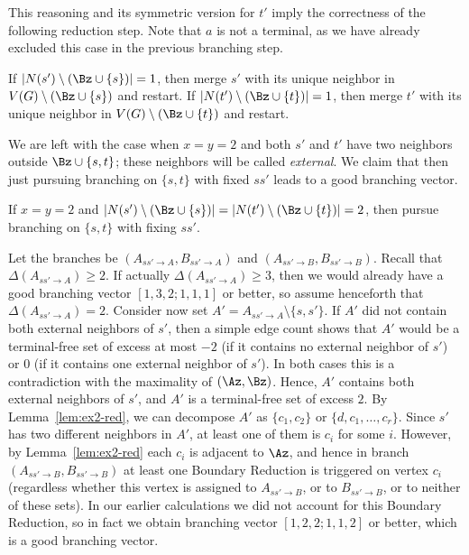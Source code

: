 This reasoning and its symmetric version for $t'$ imply the correctness of the following reduction step.
Note that $a$ is not a terminal, as we have already excluded this case in the previous branching step.

\begin{reductionstep}
If $|N(s')\setminus (\Bz\cup \{s\})|=1$, then merge $s'$ with its unique neighbor in $V(G)\setminus (\Bz\cup \{s\})$ and restart. If $|N(t')\setminus (\Bz\cup \{t\})|=1$, then merge $t'$ with its unique neighbor in $V(G)\setminus (\Bz\cup \{t\})$ and restart.
\end{reductionstep}

We are left with the case when $x=y=2$ and both $s'$ and $t'$ have two neighbors outside $\Bz\cup \{s,t\}$; these neighbors will be called {\em{external}}. We claim that then just pursuing branching on $\{s,t\}$ with fixed $ss'$ leads to a good branching vector.

\begin{branching}
If $x=y=2$ and $|N(s')\setminus (\Bz\cup \{s\})|=|N(t')\setminus (\Bz\cup \{t\})|=2$, then pursue branching on $\{s,t\}$ with fixing $ss'$.
\end{branching}

Let the branches be $(A_{ss'\to A},B_{ss'\to A})$ and $(A_{ss'\to B},B_{ss'\to B})$. Recall that $\Delta(A_{ss'\to A})\geq 2$. If actually $\Delta(A_{ss'\to A})\geq 3$, then we would already have a good branching vector $[1,3,2;1,1,1]$ or better, so assume henceforth that $\Delta(A_{ss'\to A})=2$. Consider now set $A'=A_{ss'\to A}\setminus \{s,s'\}$. If $A'$ did not contain both external neighbors of $s'$, then a simple edge count shows that $A'$ would be a terminal-free set of excess at most $-2$ (if it contains no external neighbor of $s'$) or $0$ (if it contains one external neighbor of $s'$). In both cases this is a contradiction with the maximality of $(\Az,\Bz)$. Hence, $A'$ contains both external neighbors of $s'$, and $A'$ is a terminal-free set of excess $2$. By Lemma~\ref{lem:ex2-red}, we can decompose $A'$ as $\{c_1,c_2\}$ or $\{d,c_1,\ldots,c_r\}$. Since $s'$ has two different neighbors in $A'$, at least one of them is $c_i$ for some $i$. However, by Lemma~\ref{lem:ex2-red} each $c_i$ is adjacent to $\Az$, and hence in branch $(A_{ss'\to B},B_{ss'\to B})$ at least one Boundary Reduction is triggered on vertex $c_i$ (regardless whether this vertex is assigned to $A_{ss'\to B}$, or to $B_{ss'\to B}$, or to neither of these sets). In our earlier calculations we did not account for this Boundary Reduction, so in fact we obtain branching vector $[1,2,2;1,1,2]$ or better, which is a good branching vector.











